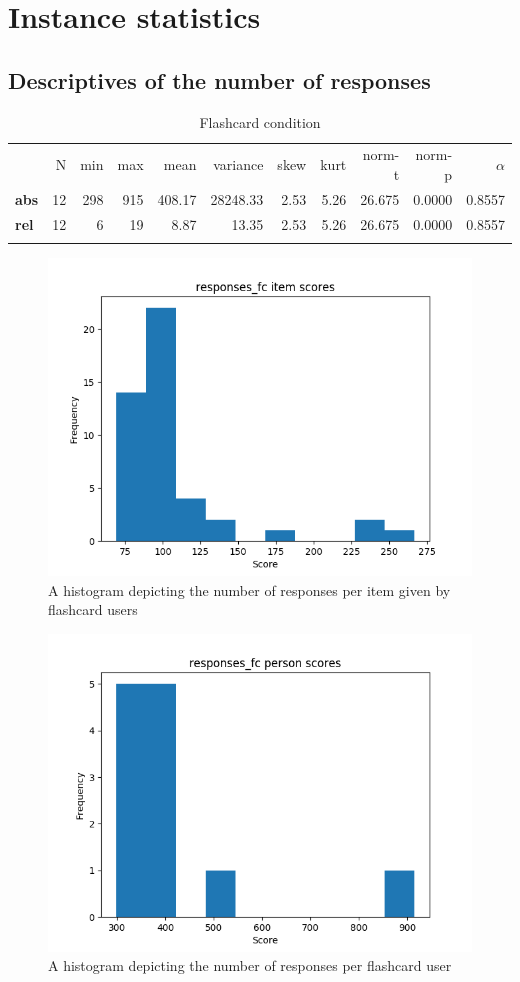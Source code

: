 \chapter{Instance statistics}

\FloatBarrier
\section{Descriptives of the number of responses}

\begin{longtable}[c]{@{}lrrrrrrrrrr@{}}
\caption{Flashcard condition}
\endfirsthead
\endhead
\toprule\addlinespace
& N & min & max & mean & variance & skew & kurt & norm-t &
norm-p & $\alpha$
\\\addlinespace
\midrule
\textbf{abs} & 12 & 298 & 915 & 408.17 & 28248.33 & 2.53 & 5.26 & 26.675
& 0.0000 & 0.8557
\\\addlinespace
\textbf{rel} & 12 & 6 & 19 & 8.87 & 13.35 & 2.53 & 5.26 & 26.675 &
0.0000 & 0.8557
\\\addlinespace
\bottomrule
    \label{tab:responses_fc}
\end{longtable}

\begin{figure}
    \centering
    \includegraphics[width=.7\textwidth]{img/responses_fc_diff.png}
    \caption{A histogram depicting the number of responses per item given by flashcard users}
    \label{fig:responses_fc_diff}
\end{figure}
\begin{figure}
    \centering
    \includegraphics[width=.7\textwidth]{img/responses_fc_abil.png}
    \caption{A histogram depicting the number of responses per flashcard user}
    \label{fig:responses_fc_abil}
\end{figure}

